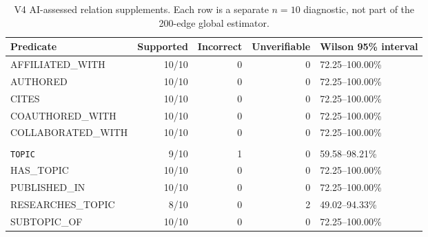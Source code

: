 \begin{table}[!htbp]
  \centering
  \caption[V4 relation-level AI diagnostics]{V4 AI-assessed relation supplements. Each row is a separate $n=10$
  diagnostic, not part of the 200-edge global estimator.}
  \label{tab:v4-relation-supplement}
  \small
  \begin{tabularx}{\textwidth}{>{\ttfamily\raggedright\arraybackslash}p{3.8cm}rrrX}
    \toprule
    \textbf{Predicate} & \textbf{Supported} & \textbf{Incorrect} &
    \textbf{Unverifiable} & \textbf{Wilson 95\% interval}\\
    \midrule
    AFFILIATED\_WITH & 10/10 & 0 & 0 & 72.25--100.00\%\\
    AUTHORED & 10/10 & 0 & 0 & 72.25--100.00\%\\
    CITES & 10/10 & 0 & 0 & 72.25--100.00\%\\
    COAUTHORED\_WITH & 10/10 & 0 & 0 & 72.25--100.00\%\\
    COLLABORATED\_WITH & 10/10 & 0 & 0 & 72.25--100.00\%\\
    \makecell[l]{\texttt{CONTRIBUTES\_TO\_}\\\texttt{TOPIC}} & 9/10 & 1 & 0 & 59.58--98.21\%\\
    HAS\_TOPIC & 10/10 & 0 & 0 & 72.25--100.00\%\\
    PUBLISHED\_IN & 10/10 & 0 & 0 & 72.25--100.00\%\\
    RESEARCHES\_TOPIC & 8/10 & 0 & 2 & 49.02--94.33\%\\
    SUBTOPIC\_OF & 10/10 & 0 & 0 & 72.25--100.00\%\\
    \bottomrule
  \end{tabularx}
\end{table}
